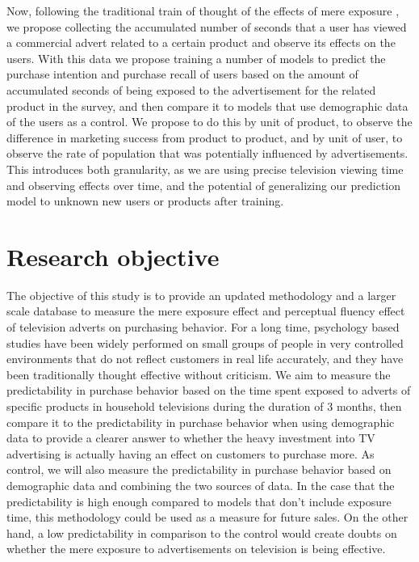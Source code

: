 \documentclass[review]{elsarticle}
\begin{document}
Now, following the traditional train of thought of the effects of mere exposure \cite[][]{zajonc}, we propose collecting the accumulated number of seconds that a user has viewed a commercial advert related to a certain product and observe its effects on the users. With this data we propose training a number of models to predict the purchase intention and purchase recall of users based on the amount of accumulated seconds of being exposed to the advertisement for the related product in the survey, and then compare it to models that use demographic data of the users as a control. We propose to do this by unit of product, to observe the difference in marketing success from product to product, and by unit of user, to observe the rate of population that was potentially influenced by advertisements. This introduces both granularity, as we are using precise television viewing time and observing effects over time, and the potential of generalizing our prediction model to unknown new users or products after training.

\section{Research objective}
\label{resobj}

The objective of this study is to provide an updated methodology and a larger scale database to measure the mere exposure effect and perceptual fluency effect of television adverts on purchasing behavior. For a long time, psychology based studies have been widely performed on small groups of people in very controlled environments that do not reflect customers in real life accurately, and they have been traditionally thought effective without criticism. We aim to measure the predictability in purchase behavior based on the time spent exposed to adverts of specific products in household televisions during the duration of 3 months, then compare it to the predictability in purchase behavior when using demographic data to provide a clearer answer to whether the heavy investment into TV advertising is actually having an effect on customers to purchase more. As control, we will also measure the predictability in purchase behavior based on demographic data and combining the two sources of data. In the case that the predictability is high enough compared to models that don't include exposure time, this methodology could be used as a measure for future sales. On the other hand, a low predictability in comparison to the control would create doubts on whether the mere exposure to advertisements on television is being effective.
\end{document}
